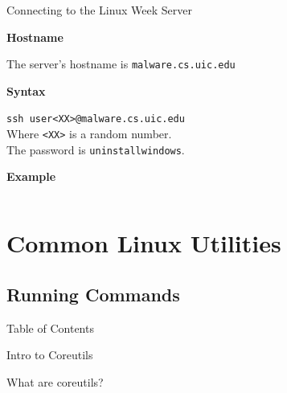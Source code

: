 \documentclass{beamer}
\begin{document}
\begin{frame}{Connecting to the Linux Week Server}
	\begin{Large}
		\textbf{Hostname} \\
	\end{Large}
	The server's hostname is \texttt{malware.cs.uic.edu}

	\vspace{0.3cm}

	\begin{Large}
		\textbf{Syntax} \\
	\end{Large}
	\texttt{ssh user<XX>@malware.cs.uic.edu} \\
	Where \texttt{<XX>} is a random number. \\
	The password is \texttt{uninstallwindows}.

	\vspace{0.3cm}

	\begin{Large}
		\textbf{Example} \\
	\end{Large}
	\inputminted{shell-session}{ssh-conn.txt}
\end{frame}

\section{Common Linux Utilities}
\subsection{Running Commands}
\begin{frame}{Table of Contents}
	\tableofcontents[currentsection]
\end{frame}

\begin{frame}{Intro to Coreutils}
	\begin{center}
		\Huge What are coreutils?
	\end{center}
\end{frame}
\end{document}
